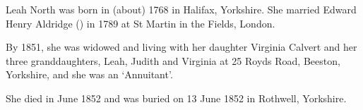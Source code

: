 
Leah North was born in (about) 1768 in Halifax, Yorkshire. She married Edward Henry Aldridge () in 1789 at St Martin in the Fields, London.

By 1851, she was widowed and living with her daughter Virginia Calvert and her three granddaughters, Leah, Judith and Virginia at 25 Royds Road, Beeston, Yorkshire, and she was an `Annuitant'.\cite{LNorth1851}

She died in June 1852 and was buried on 13 June 1852 in Rothwell, Yorkshire.\cite{LNorthDeath}
